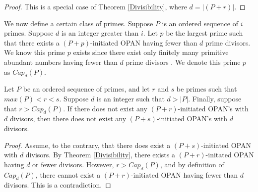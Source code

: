 \documentclass[../paper.tex]{subfiles}
\begin{document}
\begin{proof}
This is a special case of Theorem {\ref{Divisibility}}, where $d = |(P + r)|$.
\end{proof}

We now define a certain class of primes.
Suppose $P$ is an ordered sequence of $i$ primes. Suppose $d$ is
an integer greater than $i$. Let $p$ be the largest prime such 
that there exists a $(P + p)$-initiated OPAN having fewer than $d$ 
prime divisors. We know this prime $p$ exists since 
there exist only finitely many primitive abundant numbers having
fewer than $d$ prime divisors \cite{dickson}. We denote this prime $p$
as $Cap_d(P)$. 

\begin{theorem}\label{cap}
Let $P$ be an ordered sequence of primes, and  let $r$ and $s$ be 
primes such that $max(P) < r < s$. Suppose $d$ is an integer such
that $d > |P|$. Finally, suppose that $r > Cap_d(P)$. If there
does not exist any $(P + r)$-initiated OPAN's with $d$ divisors,
then there does not exist any $(P + s)$-initiated OPAN's with $d$ 
divisors.
\end{theorem}

\begin{proof}
Assume, to the contrary, that there does exist a $(P + 
s)$-initiated OPAN with $d$ divisors. By Theorem {\ref{Divisibility}},
there exists a $(P + r)$-initated OPAN having $d$ or fewer
divisors. However, $r > Cap_d(P)$, and by definition of
$Cap_d(P)$, there cannot exist a $(P + r)$-initiated OPAN having
fewer than $d$ divisors. This is a contradiction.
\end{proof}
\end{document}
